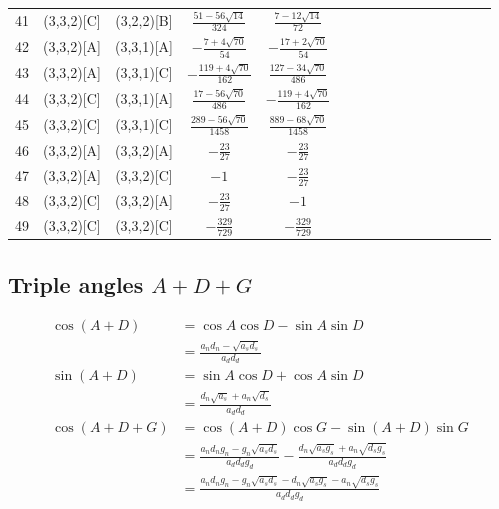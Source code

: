 \documentclass[11pt]{article}
\begin{document}
\begin{longtable}{ | p{1cm}| *{15}{c|} }
41 & (3,3,2)[C] & (3,2,2)[B] & $\frac{51-56\sqrt{14}}{324}$ & $\frac{7-12\sqrt{14}}{72}$\\
42 & (3,3,2)[A] & (3,3,1)[A] & $-\frac{7+4\sqrt{70}}{54}$ & $-\frac{17+2\sqrt{70}}{54}$\\
43 & (3,3,2)[A] & (3,3,1)[C] & $-\frac{119+4\sqrt{70}}{162}$ & $\frac{127-34\sqrt{70}}{486}$\\
44 & (3,3,2)[C] & (3,3,1)[A] & $\frac{17-56\sqrt{70}}{486}$ & $-\frac{119+4\sqrt{70}}{162}$\\
45 & (3,3,2)[C] & (3,3,1)[C] & $\frac{289-56\sqrt{70}}{1458}$ & $\frac{889-68\sqrt{70}}{1458}$\\
46 & (3,3,2)[A] & (3,3,2)[A] & $-\frac{23}{27}$ & $-\frac{23}{27}$\\
47 & (3,3,2)[A] & (3,3,2)[C] & $-1$ & $-\frac{23}{27}$\\
48 & (3,3,2)[C] & (3,3,2)[A] & $-\frac{23}{27}$ & $-1$\\
49 & (3,3,2)[C] & (3,3,2)[C] & $-\frac{329}{729}$ & $-\frac{329}{729}$\\
\end{longtable}

\subsection{Triple angles $A+D+G$}

\begin{align}
\cos{(A+D)} &= \cos{A}\cos{D} - \sin{A}\sin{D} \nonumber\\
 &= \frac{a_nd_n - \sqrt{a_sd_s}}{a_dd_d}\\
\sin{(A+D)} &= \sin{A}\cos{D} + \cos{A}\sin{D} \nonumber\\
 &= \frac{d_n\sqrt{a_s} + a_n\sqrt{d_s}}{a_dd_d}\\
\cos{(A+D+G)} &= \cos{(A+D)}\cos{G} - \sin{(A+D)}\sin{G} \nonumber\\
 &= \frac{a_nd_ng_n - g_n\sqrt{a_sd_s}}{a_dd_dg_d}
 -\frac{d_n\sqrt{a_sg_s} + a_n\sqrt{d_sg_s}}{a_dd_dg_d} \nonumber\\
 &= \frac{a_nd_ng_n - g_n\sqrt{a_sd_s} - d_n\sqrt{a_sg_s} - a_n\sqrt{d_sg_s}}{a_dd_dg_d}
\end{align}
\end{document}
